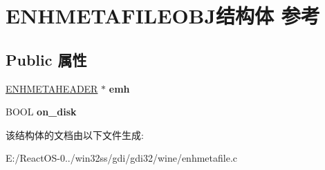 \hypertarget{struct_e_n_h_m_e_t_a_f_i_l_e_o_b_j}{}\section{E\+N\+H\+M\+E\+T\+A\+F\+I\+L\+E\+O\+B\+J结构体 参考}
\label{struct_e_n_h_m_e_t_a_f_i_l_e_o_b_j}
\subsection*{Public 属性}
\begin{DoxyCompactItemize}
\item 
\mbox{\label{struct_e_n_h_m_e_t_a_f_i_l_e_o_b_j_a2ddb69220544112613d378b957f4ab43}} 
\hyperlink{structtag_e_n_h_m_e_t_a_h_e_a_d_e_r}{E\+N\+H\+M\+E\+T\+A\+H\+E\+A\+D\+ER} $\ast$ {\bfseries emh}
\item 
\mbox{\label{struct_e_n_h_m_e_t_a_f_i_l_e_o_b_j_ae1ffee1c591daebc690e5db68c72df6f}} 
B\+O\+OL {\bfseries on\+\_\+disk}
\end{DoxyCompactItemize}


该结构体的文档由以下文件生成\+:\begin{DoxyCompactItemize}
\item 
E\+:/\+React\+O\+S-\/0../win32ss/gdi/gdi32/wine/enhmetafile.\+c\end{DoxyCompactItemize}
